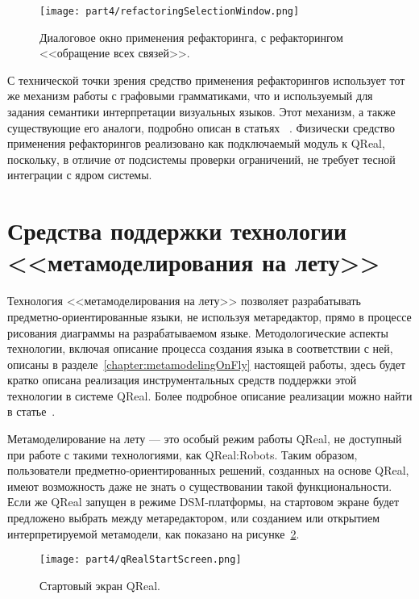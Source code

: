 \begin{figure} [ht]
	\begin{center}
		\texttt{[image: part4/refactoringSelectionWindow.png]}
		\caption{Диалоговое окно применения рефакторинга, с рефакторингом <<обращение всех связей>>.}
		\label{image:refactoringSelectionWindow}
	\end{center}
\end{figure}

С технической точки зрения средство применения рефакторингов использует тот же механизм 
работы с графовыми грамматиками, что и используемый для задания семантики интерпретации 
визуальных языков. Этот механизм, а также существующие его аналоги, подробно описан в статьях%
~\cite{polyakov2013interpreters, polyakov2013semantics, polyakov2012semantics, polyakov2012interpreter}.
Физически средство применения рефакторингов реализовано как подключаемый модуль к 
QReal, поскольку, в отличие от подсистемы проверки ограничений, не требует тесной 
интеграции с ядром системы.

\section{Средства поддержки технологии <<метамоделирования на лету>>}
Технология <<метамоделирования на лету>> позволяет разрабатывать предметно-ориентированные 
языки, не используя метаредактор, прямо в процессе рисования диаграммы на разрабатываемом 
языке. Методологические аспекты технологии, включая описание процесса создания языка 
в соответствии с ней, описаны в разделе~\ref{chapter:metamodelingOnFly} настоящей 
работы, здесь будет кратко описана реализация инструментальных средств поддержки этой 
технологии в системе QReal. Более подробное описание реализации можно найти в статье~\cite{ptakhina2013metamodeling}.

Метамоделирование на лету --- это особый режим работы QReal, не доступный при работе 
с такими технологиями, как QReal:Robots. Таким образом, пользователи предметно-ориентированных 
решений, созданных на основе QReal, имеют возможность даже не знать о существовании 
такой функциональности. Если же QReal запущен в режиме \ac{DSM}-платформы, на стартовом 
экране будет предложено выбрать между метаредактором, или созданием или открытием 
интерпретируемой метамодели, как показано на рисунке~\ref{image:qRealStartScreen}.

\begin{figure} [ht]
	\begin{center}
		\texttt{[image: part4/qRealStartScreen.png]}
		\caption{Стартовый экран QReal.}
		\label{image:qRealStartScreen}
	\end{center}
\end{figure}

